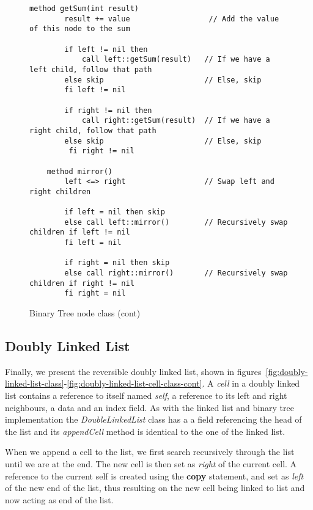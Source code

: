 \begin{figure}[ht!]
    \centering
    \begin{lstlisting}[style = basic, language = roopl] 
    method getSum(int result)
        result += value                  // Add the value of this node to the sum   

        if left != nil then
            call left::getSum(result)   // If we have a left child, follow that path
        else skip                       // Else, skip
        fi left != nil

        if right != nil then
            call right::getSum(result)  // If we have a right child, follow that path
        else skip                       // Else, skip
         fi right != nil

    method mirror()
        left <=> right                  // Swap left and right children

        if left = nil then skip
        else call left::mirror()        // Recursively swap children if left != nil
        fi left = nil

        if right = nil then skip
        else call right::mirror()       // Recursively swap children if right != nil
        fi right = nil 
    \end{lstlisting}
    \caption{Binary Tree node class (cont)}
    \label{fig:binary-tree-node-class-cont}
\end{figure}


\subsection{Doubly Linked List}
\label{subsec:doubly-linked-list}
Finally, we present the reversible doubly linked list, shown in figures~\ref{fig:doubly-linked-list-class}-\ref{fig:doubly-linked-list-cell-class-cont}. A \textit{cell} in a doubly linked list contains a reference to itself named \textit{self}, a reference to its left and right neighbours, a data and an index field. As with the linked list and binary tree implementation the \textit{DoubleLinkedList} class has a a field referencing the head of the list and its \textit{appendCell} method is identical to the one of the linked list. 

When we append a cell to the list, we first search recursively through the list until we are at the end. The new cell is then set as \textit{right} of the current cell. A reference to the current self is created using the \textbf{copy} statement, and set as \textit{left} of the new end of the list, thus resulting on the new cell being linked to list and now acting as end of the list.

